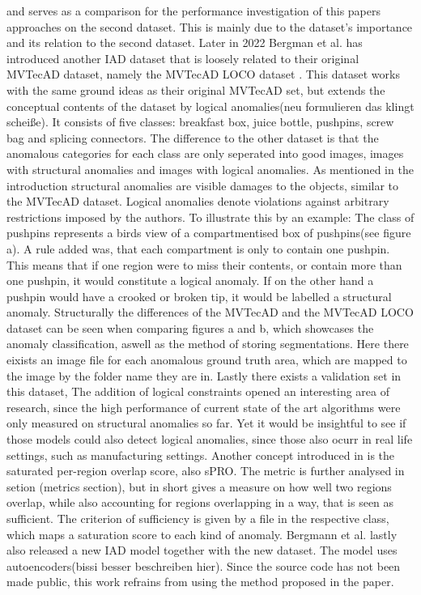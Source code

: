 and serves as a comparison for the performance investigation of this papers approaches on the second dataset. This is mainly due to the dataset's importance and 
its relation to the second dataset.
\newline
Later in 2022 Bergman et al. has introduced another IAD dataset that is loosely related to their original MVTecAD dataset, namely the MVTecAD LOCO dataset \cite{LOCODentsAndScratchesBergmann2022}. 
This dataset works with the same ground ideas as their original MVTecAD set, but extends the conceptual contents of the dataset by logical anomalies(neu formulieren das klingt scheiße). 
It consists of five classes: breakfast box, juice bottle, pushpins, screw bag and splicing connectors. The difference to the other dataset is that the anomalous categories for each class are only seperated into good images, images with structural anomalies 
and images with logical anomalies. As mentioned in the introduction structural anomalies are visible damages to the objects, similar to the MVTecAD dataset. Logical anomalies denote violations against arbitrary restrictions 
imposed by the authors. To illustrate this by an example: The class of pushpins represents a birds view of a compartmentised box of pushpins(see figure a). A rule added was, 
that each compartment is only to contain one pushpin. This means that if one region were to miss their contents, or contain more than one pushpin, it would constitute a logical anomaly. If on the 
other hand a pushpin would have a crooked or broken tip, it would be  labelled a structural anomaly. Structurally the differences of the 
MVTecAD and the MVTecAD LOCO dataset can be seen when comparing figures a and b, which showcases the anomaly classification, aswell as 
the method of storing segmentations. Here there eixists an image file for each anomalous ground truth area, which are mapped to the image 
by the folder name they are in. Lastly there exists a validation set in this dataset,
\newline
The addition of logical constraints opened an interesting area of research, since the high performance 
of current state of the art algorithms were only measured on structural anomalies so far. Yet it would be insightful to see if those models could also detect logical anomalies, since those also ocurr 
in real life settings, such as manufacturing settings. Another concept introduced in \cite{LOCODentsAndScratchesBergmann2022} is the 
saturated per-region overlap score, also sPRO. The metric is further analysed in setion (metrics section), but in short gives a measure 
on how well two regions overlap, while also accounting for regions overlapping in a way, that is seen as sufficient. The criterion of 
sufficiency is given by a file in the respective class, which maps a saturation score to each kind of anomaly.
Bergmann et al.\cite{LOCODentsAndScratchesBergmann2022} lastly also released a new IAD model together with the new dataset. The model uses autoencoders(bissi besser beschreiben hier). Since the source code has not been made public, 
this work refrains from using the method proposed in the paper.




